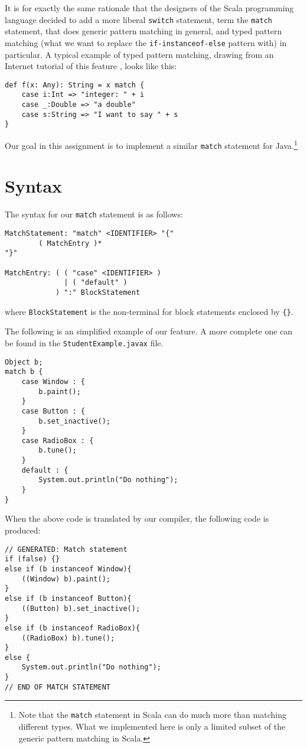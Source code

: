 \documentclass[twocolumn]{article}
\begin{document}
It is for exactly the same rationale that the designers of the Scala
programming language decided to add a more liberal \verb|switch|
statement, term the \verb|match| statement, that does generic
pattern matching \cite{scalaref1} in general, and typed pattern matching (what we want to replace the {\tt if-instanceof-else} pattern with) in particular.
A typical example of typed pattern
matching, drawing from
an Internet tutorial of this feature \cite{playing}, looks like this:
\begin{verbatim}
def f(x: Any): String = x match {
    case i:Int => "integer: " + i
    case _:Double => "a double"
    case s:String => "I want to say " + s
}
\end{verbatim}
Our goal in this assignment is to implement a similar \verb|match| statement
for Java.\footnote{Note that the {\tt match} statement in Scala
can do much more than matching different types. What we implemented here
is only a limited subset of the generic pattern matching in Scala.}


\section{Syntax}
The syntax for our \verb|match| statement is as follows:
\begin{verbatim}
MatchStatement: "match" <IDENTIFIER> "{"
        ( MatchEntry )*
"}"

MatchEntry: ( ( "case" <IDENTIFIER> )
              | ( "default" )
            ) ":" BlockStatement
\end{verbatim}
where \verb|BlockStatement| is the non-terminal for block statements
enclosed by \verb|{}|.

The following is an simplified example of our feature. A more complete
one can be found in the \verb|StudentExample.javax| file.
\begin{verbatim}
Object b;
match b {
    case Window : {
        b.paint();
    }
    case Button : {
        b.set_inactive();
    }
    case RadioBox : {
        b.tune();
    }
    default : {
        System.out.println("Do nothing");
    }
}
\end{verbatim}

When the above code is translated by our compiler, the following
code is produced:
\begin{verbatim}
// GENERATED: Match statement
if (false) {}
else if (b instanceof Window){
    ((Window) b).paint();
}
else if (b instanceof Button){
    ((Button) b).set_inactive();
}
else if (b instanceof RadioBox){
    ((RadioBox) b).tune();
}
else {
    System.out.println("Do nothing");
}
// END OF MATCH STATEMENT
\end{verbatim}
\end{document}
